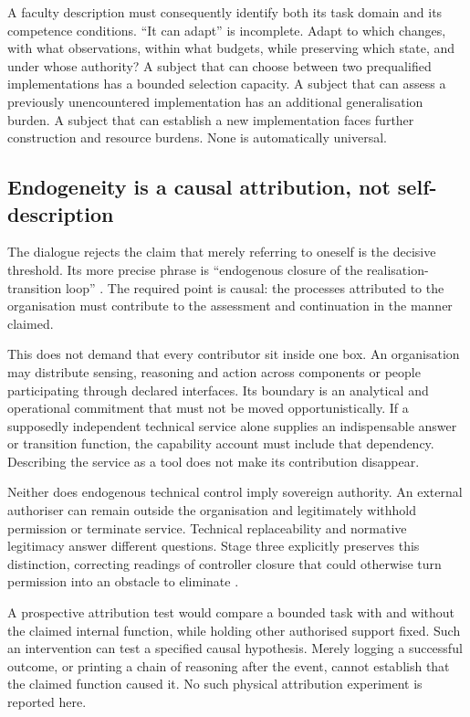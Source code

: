 A faculty description must consequently identify both its task domain and its competence conditions. ``It can adapt'' is incomplete. Adapt to which changes, with what observations, within what budgets, while preserving which state, and under whose authority? A subject that can choose between two prequalified implementations has a bounded selection capacity. A subject that can assess a previously unencountered implementation has an additional generalisation burden. A subject that can establish a new implementation faces further construction and resource burdens. None is automatically universal.

\subsection{Endogeneity is a causal attribution, not self-description}

The dialogue rejects the claim that merely referring to oneself is the decisive threshold. Its more precise phrase is ``endogenous closure of the realisation-transition loop'' \cite[07:02:59]{D}. The required point is causal: the processes attributed to the organisation must contribute to the assessment and continuation in the manner claimed.

This does not demand that every contributor sit inside one box. An organisation may distribute sensing, reasoning and action across components or people participating through declared interfaces. Its boundary is an analytical and operational commitment that must not be moved opportunistically. If a supposedly independent technical service alone supplies an indispensable answer or transition function, the capability account must include that dependency. Describing the service as a tool does not make its contribution disappear.

Neither does endogenous technical control imply sovereign authority. An external authoriser can remain outside the organisation and legitimately withhold permission or terminate service. Technical replaceability and normative legitimacy answer different questions. Stage three explicitly preserves this distinction, correcting readings of controller closure that could otherwise turn permission into an obstacle to eliminate \cite[\S12.2]{S3}.

A prospective attribution test would compare a bounded task with and without the claimed internal function, while holding other authorised support fixed. Such an intervention can test a specified causal hypothesis. Merely logging a successful outcome, or printing a chain of reasoning after the event, cannot establish that the claimed function caused it. No such physical attribution experiment is reported here.

